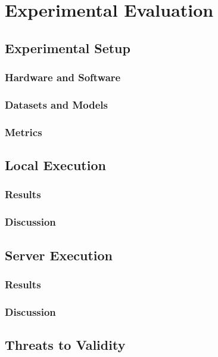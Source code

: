 \chapter{Experimental Evaluation}

\section{Experimental Setup}
\subsection{Hardware and Software}

\subsection{Datasets and Models}

\subsection{Metrics}

\section{Local Execution}
\subsection{Results}

\subsection{Discussion}

\section{Server Execution}
\subsection{Results}

\subsection{Discussion}

\section{Threats to Validity}
